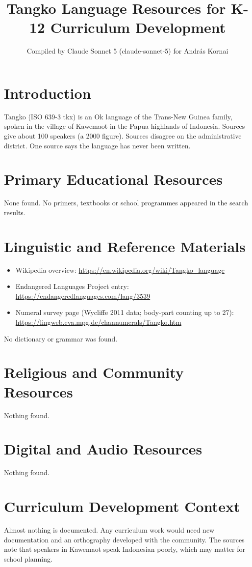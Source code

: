 \documentclass[12pt]{article}
\title{Tangko Language Resources for K-12 Curriculum Development}
\author{Compiled by Claude Sonnet 5 (claude-sonnet-5) for Andr\'as Kornai}
\date{}
\begin{document}
\maketitle

\section{Introduction}
Tangko (ISO 639-3 tkx) is an Ok language of the Trans-New Guinea family, spoken in the village of Kawemaot in the Papua highlands of Indonesia. Sources give about 100 speakers (a 2000 figure). Sources disagree on the administrative district. One source says the language has never been written.

\section{Primary Educational Resources}
None found. No primers, textbooks or school programmes appeared in the search results.

\section{Linguistic and Reference Materials}
\begin{itemize}
\item Wikipedia overview: \url{https://en.wikipedia.org/wiki/Tangko_language}
\item Endangered Languages Project entry: \url{https://endangeredlanguages.com/lang/3539}
\item Numeral survey page (Wycliffe 2011 data; body-part counting up to 27): \url{https://lingweb.eva.mpg.de/channumerals/Tangko.htm}
\end{itemize}
No dictionary or grammar was found.

\section{Religious and Community Resources}
Nothing found.

\section{Digital and Audio Resources}
Nothing found.

\section{Curriculum Development Context}
Almost nothing is documented. Any curriculum work would need new documentation and an orthography developed with the community. The sources note that speakers in Kawemaot speak Indonesian poorly, which may matter for school planning.
\end{document}
